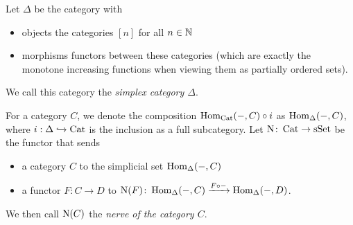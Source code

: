 \begin{definition}
    Let $\Delta$ be the category with
    \begin{itemize}
        \item objects the categories $[n]$ for all $n\in\mathbb{N}$
        \item morphisms functors between these categories (which are exactly the monotone increasing functions when viewing them as partially ordered sets).
    \end{itemize}
    We call this category the \emph{simplex category $\Delta$}.
\end{definition}
\begin{definition} %
    For a category $C$, we denote the composition $\operatorname{Hom}_{\operatorname{Cat}}(-,C)\circ i$ as $\operatorname{Hom}_{\Delta}(-,C)$, where $i:\Delta\xhookrightarrow{}\operatorname{Cat}$ is the inclusion as a full subcategory.
    Let $\operatorname{N}\colon\operatorname{Cat}\to\operatorname{sSet}$ be the functor that sends
    \begin{itemize}
        \item a category $C$ to the simplicial set $\operatorname{Hom}_{\Delta}(-,C)$
        \item a functor $F:C\to D$ to $\operatorname{N}(F)\colon\operatorname{Hom}_{\Delta}(-,C)\xrightarrow{F\circ -}\operatorname{Hom}_{\Delta}(-,D)$\;.
    \end{itemize}
    We then call $\operatorname{N}(C)$ the \emph{nerve of the category $C$}.
\end{definition}
